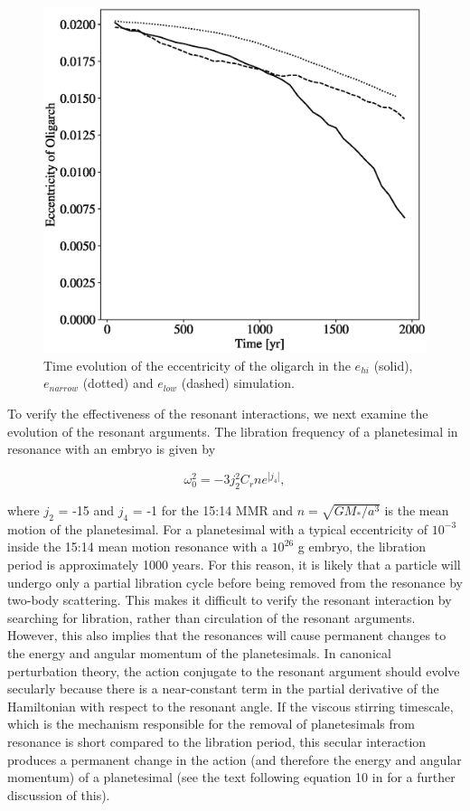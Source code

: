 \begin{figure}
    \includegraphics[width=\columnwidth]{figures/plSS/hetero_e_oli.eps}
    \caption{Time evolution of the eccentricity of the oligarch in the $e_{hi}$ (solid), $e_{narrow}$ (dotted) and $e_{low}$ (dashed) 
    simulation.}
    \label{fig:e_oli_evo}
\end{figure}

To verify the effectiveness of the resonant interactions, we next examine the evolution of the resonant arguments. The libration 
frequency of a planetesimal in resonance with an embryo is given by \cite{murray00}

\begin{equation}\label{eq:lib_period}
    \omega_{0}^{2} = -3 j_{2}^{2} C_{r} n e^{\left| j_{4} \right|},
\end{equation}

\noindent where $j_{2}$ = -15 and $j_{4}$ = -1 for the 15:14 MMR and $n = \sqrt{G M_{*} / a^{3}}$ is the mean motion of the 
planetesimal. For a planetesimal with a typical eccentricity of $10^{-3}$ inside the 15:14 mean motion resonance with a 
$10^{26}$ g embryo, the libration period is approximately 1000 years. For this reason, it is likely that a particle will undergo only 
a partial libration cycle before being removed from the resonance by two-body scattering. This makes it difficult to verify the 
resonant interaction by searching for libration, rather than circulation of the resonant arguments. However, this also implies that 
the resonances will cause permanent changes to the energy and angular momentum of the planetesimals. In canonical 
perturbation theory, the action conjugate to the resonant argument should evolve secularly because there is a near-constant 
term in the partial derivative of the Hamiltonian with respect to the resonant angle. If the viscous stirring timescale, which is the 
mechanism responsible for the removal of planetesimals from resonance is short compared to the libration period, this secular 
interaction produces a permanent change in the action (and therefore the energy and angular momentum) of a planetesimal 
(see the text following equation 10 in \cite{weinberg07a} for a further discussion of this).

